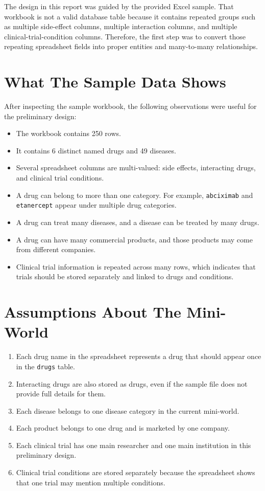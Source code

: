 \documentclass[12pt,a4paper]{article}
\begin{document}
The design in this report was guided by the provided Excel sample. That workbook is not a valid
database table because it contains repeated groups such as multiple side-effect columns, multiple
interaction columns, and multiple clinical-trial-condition columns. Therefore, the first step was to
convert those repeating spreadsheet fields into proper entities and many-to-many relationships.

\section{What The Sample Data Shows}
After inspecting the sample workbook, the following observations were useful for the preliminary
design:

\begin{itemize}[leftmargin=1.5em]
    \item The workbook contains 250 rows.
    \item It contains 6 distinct named drugs and 49 diseases.
    \item Several spreadsheet columns are multi-valued: side effects, interacting drugs, and clinical trial conditions.
    \item A drug can belong to more than one category. For example, \texttt{abciximab} and \texttt{etanercept} appear under multiple drug categories.
    \item A drug can treat many diseases, and a disease can be treated by many drugs.
    \item A drug can have many commercial products, and those products may come from different companies.
    \item Clinical trial information is repeated across many rows, which indicates that trials should be stored separately and linked to drugs and conditions.
\end{itemize}

\section{Assumptions About The Mini-World}
\begin{enumerate}[leftmargin=1.5em]
    \item Each drug name in the spreadsheet represents a drug that should appear once in the \texttt{drugs} table.
    \item Interacting drugs are also stored as drugs, even if the sample file does not provide full details for them.
    \item Each disease belongs to one disease category in the current mini-world.
    \item Each product belongs to one drug and is marketed by one company.
    \item Each clinical trial has one main researcher and one main institution in this preliminary design.
    \item Clinical trial conditions are stored separately because the spreadsheet shows that one trial may mention multiple conditions.
\end{enumerate}
\end{document}
